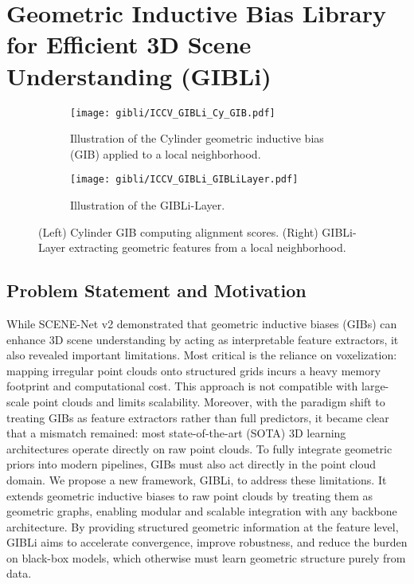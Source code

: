 \section{Geometric Inductive Bias Library for Efficient 3D Scene Understanding (GIBLi)}\label{sec:gibli}

\begin{figure}[ht]
      \centering
      \begin{subfigure}[t]{0.48\columnwidth}
          \centering
          \texttt{[image: gibli/ICCV\_GIBLi\_Cy\_GIB.pdf]}
          \caption{Illustration of the Cylinder geometric inductive bias (GIB) applied to a local neighborhood.}
          \label{fig:gib_cy}
      \end{subfigure}
      \hfill
      \begin{subfigure}[t]{0.48\columnwidth}
          \centering
          \texttt{[image: gibli/ICCV\_GIBLi\_GIBLiLayer.pdf]}
          \caption{Illustration of the GIBLi-Layer.}
          \label{fig:gibli-layer}
      \end{subfigure}
      \caption[GIBLi Overview]{(Left) Cylinder GIB computing alignment scores. (Right) GIBLi-Layer extracting geometric features from a local neighborhood.}
      \label{fig:gib_pair}
  \end{figure}

\subsection{Problem Statement and Motivation}

While SCENE-Net v2 demonstrated that geometric inductive biases (GIBs) can
enhance 3D scene understanding by acting as interpretable feature extractors,
it also revealed important limitations. Most critical is the reliance on
voxelization: mapping irregular point clouds onto structured grids incurs a
heavy memory footprint and computational cost. This approach is not compatible
with large-scale point clouds and limits scalability.
%
Moreover, with the paradigm shift to treating GIBs as feature extractors rather
than full predictors, it became clear that a mismatch remained: most
state-of-the-art (SOTA) 3D learning architectures operate directly on raw point
clouds. To fully integrate geometric priors into modern pipelines, GIBs must
also act directly in the point cloud domain.
%
We propose a new framework, GIBLi, to address these limitations. It extends
geometric inductive biases to raw point clouds by treating them as geometric
graphs, enabling modular and scalable integration with any backbone
architecture. By providing structured geometric information at the feature
level, GIBLi aims to accelerate convergence, improve robustness, and reduce the
burden on black-box models, which otherwise must learn geometric structure
purely from data.

